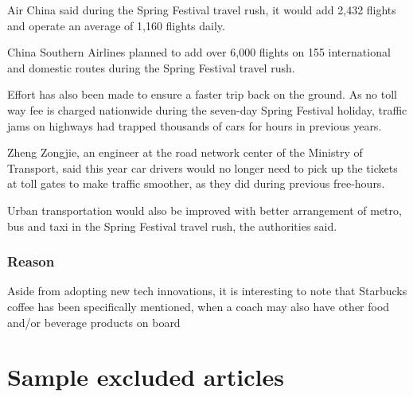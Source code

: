 \begin{displayquote}
	Air China said during the Spring Festival travel rush, it would add 2,432
	flights and operate an average of 1,160 flights daily.

	China Southern Airlines planned to add over 6,000 flights on 155 international
	and domestic routes during the Spring Festival travel rush.

	Effort has also been made to ensure a faster trip back on the ground. As no
	toll way fee is charged nationwide during the seven-day Spring Festival
	holiday, traffic jams on highways had trapped thousands of cars for hours in
	previous years.

	Zheng Zongjie, an engineer at the road network center of the Ministry of
	Transport, said this year car drivers would no longer need to pick up the
	tickets at toll gates to make traffic smoother, as they did during previous
	free-hours.

	Urban transportation would also be improved with better arrangement of metro,
	bus and taxi in the Spring Festival travel rush, the authorities said.
\end{displayquote}

\subsection{Reason}

Aside from adopting new tech innovations, it is interesting to note that
Starbucks coffee has been specifically mentioned, when a coach may also have
other food and/or beverage products on board

\chapter{Sample excluded articles}\label{appdx:news-articles-ninc}

